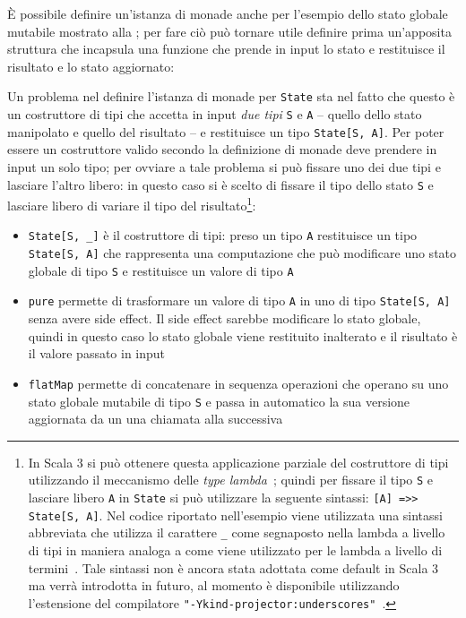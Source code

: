È possibile definire un'istanza di monade anche per l'esempio dello stato globale mutabile mostrato alla ; per fare ciò può tornare utile definire prima un'apposita struttura che incapsula una funzione che prende in input lo stato e restituisce il risultato e lo stato aggiornato:

Un problema nel definire l'istanza di monade per \lstinline{State} sta nel fatto che questo è un costruttore di tipi che accetta in input \emph{due tipi} \lstinline{S} e \lstinline{A} -- quello dello stato manipolato e quello del risultato -- e restituisce un tipo \lstinline{State[S, A]}. Per poter essere un costruttore valido secondo la definizione di monade deve prendere in input un solo tipo; per ovviare a tale problema si può fissare uno dei due tipi e lasciare l'altro libero: in questo caso si è scelto di fissare il tipo dello stato \lstinline{S} e lasciare libero di variare il tipo del risultato\footnote{In Scala 3 si può ottenere questa applicazione parziale del costruttore di tipi utilizzando il meccanismo delle \emph{type lambda}~\cite{cit:scala-reference-type-lambdas}; quindi per fissare il tipo \lstinline{S} e lasciare libero \lstinline{A} in \lstinline{State} si può utilizzare la seguente sintassi: \lstinline{[A] =>> State[S, A]}. Nel codice riportato nell'esempio viene utilizzata una sintassi abbreviata che utilizza il carattere \lstinline{_} come segnaposto nella lambda a livello di tipi in maniera analoga a come viene utilizzato per le lambda a livello di termini~\cite{cit:scala-reference-wildcard-arguments-in-types}. Tale sintassi non è ancora stata adottata come default in Scala 3 ma verrà introdotta in futuro, al momento è disponibile utilizzando l'estensione del compilatore \lstinline{"-Ykind-projector:underscores"}~\cite{cit:scala-reference-kind-projector-migration}.}:

\begin{itemize}
  \item \lstinline{State[S, _]} è il costruttore di tipi: preso un tipo \lstinline{A} restituisce un tipo \lstinline{State[S, A]} che rappresenta una computazione che può modificare uno stato globale di tipo \lstinline{S} e restituisce un valore di tipo \lstinline{A}
  \item \lstinline{pure} permette di trasformare un valore di tipo  \lstinline{A} in uno di tipo \lstinline{State[S, A]} senza avere side effect. Il side effect sarebbe modificare lo stato globale, quindi in questo caso lo stato globale viene restituito inalterato e il risultato è il valore passato in input
  \item \lstinline{flatMap} permette di concatenare in sequenza operazioni che operano su uno stato globale mutabile di tipo \lstinline{S} e passa in automatico la sua versione aggiornata da un una chiamata alla successiva
\end{itemize}

